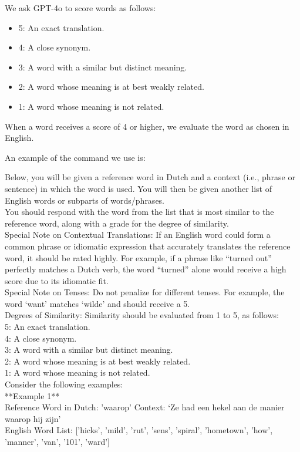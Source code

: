 We ask GPT-4o to score words as follows:
\begin{itemize}
    \item 5: An exact translation.
    \item 4: A close synonym.
    \item 3: A word with a similar but distinct meaning.
    \item 2: A word whose meaning is at best weakly related.
    \item 1: A word whose meaning is not related.
\end{itemize}
When a word receives a score of 4 or higher, we evaluate the word as chosen in English. 


An example of the command we use is:
\begin{displayquote}
Below, you will be given a reference word in Dutch and a context (i.e., phrase or sentence) in which the word is used. You will then be given another list of English words or subparts of words/phrases. \\ 
You should respond with the word from the list that is most similar to the reference word, along with a grade for the degree of similarity. \\
Special Note on Contextual Translations: If an English word could form a common phrase or idiomatic expression that accurately translates the reference word, it should be rated highly. For example, if a phrase like “turned out” perfectly matches a Dutch verb, the word “turned” alone would receive a high score due to its idiomatic fit.  \\ 
Special Note on Tenses: Do not penalize for different tenses. For example, the word ‘want’ matches ‘wilde’ and should receive a 5.  \\ 

Degrees of Similarity: Similarity should be evaluated from 1 to 5, as follows: \\ 
5: An exact translation. \\ 
4: A close synonym. \\ 
3: A word with a similar but distinct meaning. \\ 
2: A word whose meaning is at best weakly related. \\ 
1: A word whose meaning is not related. \\ 

Consider the following examples: \\ 

**Example 1** \\ 
Reference Word in Dutch: 'waarop'
Context: ‘Ze had een hekel aan de manier waarop hij zijn’ \\ 
English Word List: ['hicks', 'mild', 'rut', 'sens', 'spiral', 'hometown', 'how', 'manner', 'van', '101', 'ward'] \\ 


\end{displayquote}
